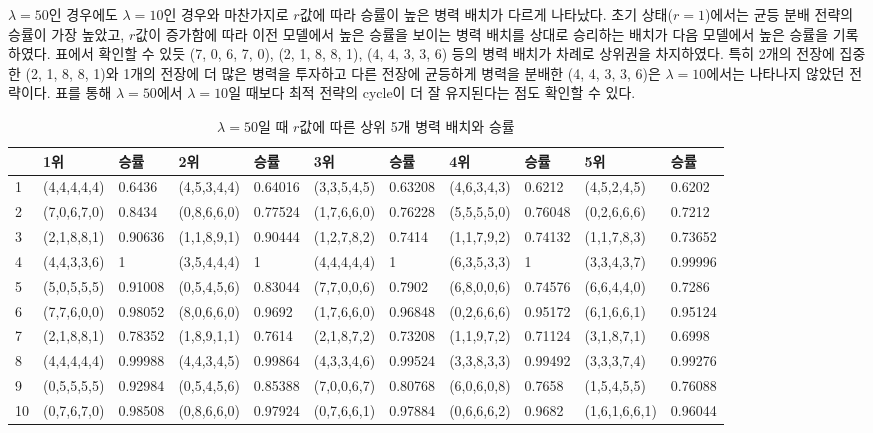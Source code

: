 $\lambda=50$인 경우에도 $\lambda=10$인 경우와 마찬가지로 $r$값에 따라 승률이 높은 병력 배치가 다르게 나타났다. 초기 상태($r=1$)에서는 균등 분배 전략의 승률이 가장 높았고, $r$값이 증가함에 따라 이전 모델에서 높은 승률을 보이는 병력 배치를 상대로 승리하는 배치가 다음 모델에서 높은 승률을 기록하였다. 표에서 확인할 수 있듯 (7, 0, 6, 7, 0), (2, 1, 8, 8, 1), (4, 4, 3, 3, 6) 등의 병력 배치가 차례로 상위권을 차지하였다. 특히 2개의 전장에 집중한 (2, 1, 8, 8, 1)와 1개의 전장에 더 많은 병력을 투자하고 다른 전장에 균등하게 병력을 분배한 (4, 4, 3, 3, 6)은 $\lambda=10$에서는 나타나지 않았던 전략이다. 표를 통해 $\lambda=50$에서 $\lambda=10$일 때보다 최적 전략의 cycle이 더 잘 유지된다는 점도 확인할 수 있다.

\vspace{1em}
\begin{table}[htb!]
    \centering
    \caption{$\lambda = 50$일 때 $r$값에 따른 상위 5개 병력 배치와 승률}
    {\scriptsize
    \begin{tabular}{l|ll|ll|ll|ll|ll}
       & 1위       & 승률      & 2위       & 승률      & 3위       & 승률      & 4위       & 승률      & 5위         & 승률      \\ \hline
    1  & (4,4,4,4,4) & 0.6436  & (4,5,3,4,4) & 0.64016 & (3,3,5,4,5) & 0.63208 & (4,6,3,4,3) & 0.6212  & (4,5,2,4,5)   & 0.6202  \\
    2  & (7,0,6,7,0) & 0.8434  & (0,8,6,6,0) & 0.77524 & (1,7,6,6,0) & 0.76228 & (5,5,5,5,0) & 0.76048 & (0,2,6,6,6)   & 0.7212  \\
    3  & (2,1,8,8,1) & 0.90636 & (1,1,8,9,1) & 0.90444 & (1,2,7,8,2) & 0.7414  & (1,1,7,9,2) & 0.74132 & (1,1,7,8,3)   & 0.73652 \\
    4  & (4,4,3,3,6) & 1       & (3,5,4,4,4) & 1       & (4,4,4,4,4) & 1       & (6,3,5,3,3) & 1       & (3,3,4,3,7)   & 0.99996 \\
    5  & (5,0,5,5,5) & 0.91008 & (0,5,4,5,6) & 0.83044 & (7,7,0,0,6) & 0.7902  & (6,8,0,0,6) & 0.74576 & (6,6,4,4,0)   & 0.7286  \\
    6  & (7,7,6,0,0) & 0.98052 & (8,0,6,6,0) & 0.9692  & (1,7,6,6,0) & 0.96848 & (0,2,6,6,6) & 0.95172 & (6,1,6,6,1)   & 0.95124 \\
    7  & (2,1,8,8,1) & 0.78352 & (1,8,9,1,1) & 0.7614  & (2,1,8,7,2) & 0.73208 & (1,1,9,7,2) & 0.71124 & (3,1,8,7,1)   & 0.6998  \\
    8  & (4,4,4,4,4) & 0.99988 & (4,4,3,4,5) & 0.99864 & (4,3,3,4,6) & 0.99524 & (3,3,8,3,3) & 0.99492 & (3,3,3,7,4)   & 0.99276 \\
    9  & (0,5,5,5,5) & 0.92984 & (0,5,4,5,6) & 0.85388 & (7,0,0,6,7) & 0.80768 & (6,0,6,0,8) & 0.7658  & (1,5,4,5,5)   & 0.76088 \\
    10 & (0,7,6,7,0) & 0.98508 & (0,8,6,6,0) & 0.97924 & (0,7,6,6,1) & 0.97884 & (0,6,6,6,2) & 0.9682  & (1,6,1,6,6,1) & 0.96044
    \end{tabular}
    }
    \label{tab:my_label}
\end{table}

